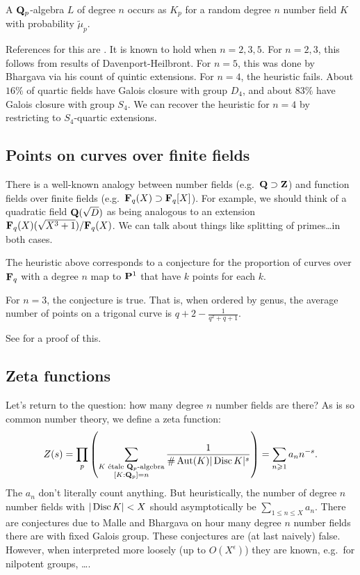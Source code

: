 \begin{heuristic}
A $\mathbf{Q}_p$-algebra $L$ of degree $n$ occurs as $K_p$ for a random degree $n$ 
number field $K$ with probability $\widetilde \mu_p$. 
\end{heuristic}

References for this are \cite{b07,m02,m04}. It is known to hold when 
$n=2,3,5$. For $n=2,3$, this follows from results of Davenport-Heilbront. 
For $n=5$, this was done by Bhargava via his count of quintic extensions. For 
$n=4$, the heuristic fails. About $16\%$ of quartic fields have Galois closure 
with group $D_4$, and about $83\%$ have Galois closure with group $S_4$. We can 
recover the heuristic for $n=4$ by restricting to $S_4$-quartic extensions. 





\subsection{Points on curves over finite fields}

There is a well-known analogy between number fields (e.g.~$\mathbf{Q}\supset\mathbf{Z}$) and 
function fields over finite fields (e.g.~$\mathbf{F}_q(X)\supset \mathbf{F}_q[X]$). For 
example, we should think of a quadratic field $\mathbf{Q}(\sqrt D)$ as being analogous 
to an extension $\mathbf{F}_q(X)(\sqrt{X^3+1})/\mathbf{F}_q(X)$. We can talk about things 
like splitting of primes\ldots in both cases. 

The heuristic above corresponds to a conjecture for the proportion of curves 
over $\mathbf{F}_q$ with a degree $n$ map to $\mathbf{P}^1$ that have $k$ points for each 
$k$. 

\begin{theo}
For $n=3$, the conjecture is true. That is, when ordered by genus, the average 
number of points on a trigonal curve is $q+2 - \frac{1}{q^2+q+1}$. 
\end{theo}

See \cite{w12-trig} for a proof of this. 





\subsection{Zeta functions}

Let's return to the question: how many degree $n$ number fields are there? As 
is so common number theory, we define a zeta function: 
\[
  Z(s) = \prod_p \left(\sum_{\substack{K\text{ \'etale $\dQ_p$-algebra} \\ [K:\dQ_p]=n}} \frac{1}{\# \automorphism(K) |\discriminant K|^s}\right) = \sum_{n\geqslant 1} a_n n^{-s} .
\]
The $a_n$ don't literally count anything. But heuristically, 
the number of degree $n$ number fields with $|\operatorname{Disc} K|<X$ should 
asymptotically be $\sum_{1\leqslant n\leqslant X} a_n$. There are conjectures 
due to Malle and Bhargava on hour many degree $n$ number fields there are with 
fixed Galois group. These conjectures are (at last naively) false. However, when 
interpreted more loosely (up to $O(X^\epsilon)$) they are known, e.g.~for nilpotent 
groups, \ldots. 




